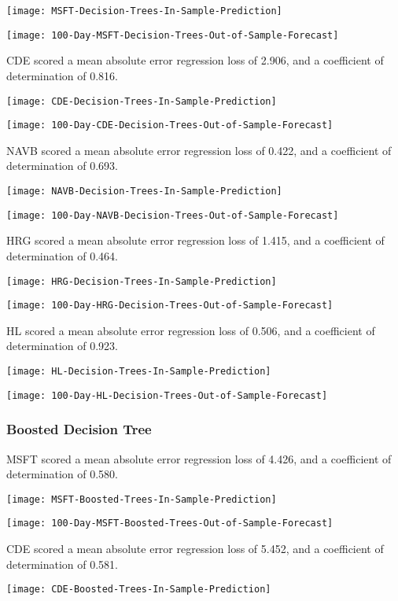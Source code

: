\texttt{[image: MSFT-Decision-Trees-In-Sample-Prediction]}

\texttt{[image: 100-Day-MSFT-Decision-Trees-Out-of-Sample-Forecast]}

CDE scored a mean absolute error regression loss of 2.906, and a coefficient of determination of 0.816.

\texttt{[image: CDE-Decision-Trees-In-Sample-Prediction]}

\texttt{[image: 100-Day-CDE-Decision-Trees-Out-of-Sample-Forecast]}

NAVB scored a mean absolute error regression loss of 0.422, and a coefficient of determination of 0.693.

\texttt{[image: NAVB-Decision-Trees-In-Sample-Prediction]}

\texttt{[image: 100-Day-NAVB-Decision-Trees-Out-of-Sample-Forecast]}

HRG scored a mean absolute error regression loss of 1.415, and a coefficient of determination of 0.464.

\texttt{[image: HRG-Decision-Trees-In-Sample-Prediction]}

\texttt{[image: 100-Day-HRG-Decision-Trees-Out-of-Sample-Forecast]}

HL scored a mean absolute error regression loss of 0.506, and a coefficient of determination of 0.923.

\texttt{[image: HL-Decision-Trees-In-Sample-Prediction]}

\texttt{[image: 100-Day-HL-Decision-Trees-Out-of-Sample-Forecast]}

\subsubsection{Boosted Decision Tree}
MSFT scored a mean absolute error regression loss of 4.426, and a coefficient of determination of 0.580.

\texttt{[image: MSFT-Boosted-Trees-In-Sample-Prediction]}

\texttt{[image: 100-Day-MSFT-Boosted-Trees-Out-of-Sample-Forecast]}

CDE scored a mean absolute error regression loss of 5.452, and a coefficient of determination of 0.581.

\texttt{[image: CDE-Boosted-Trees-In-Sample-Prediction]}

